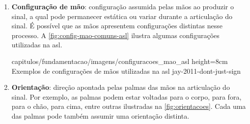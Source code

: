 \begin{enumerate}
   \item \textbf{Configuração de mão}: configuração assumida pelas mãos ao produzir o sinal, a qual pode permanecer estática ou variar durante a articulação do sinal. É possível que as mãos apresentem configurações distintas nesse processo. A \autoref{fig:config-mao-comuns-asl} ilustra algumas configurações utilizadas na \acrshort{asl}.
   
        {capitulos/fundamentacao/imagens/configuracoes_mao_asl} %
        {height=8cm} %
        {Exemplos de configurações de mãos utilizadas na \acrshort{asl}} %
        {jay-2011-dont-just-sign} %







    \item \textbf{Orientação}: direção apontada pelas palmas das mãos na articulação do sinal. Por exemplo, as palmas podem estar voltadas para o corpo, para fora, para o chão, para cima, entre outras ilustradas na \autoref{fig:orientacoes}. Cada uma das palmas pode também assumir uma orientação distinta.
    

\end{enumerate}
